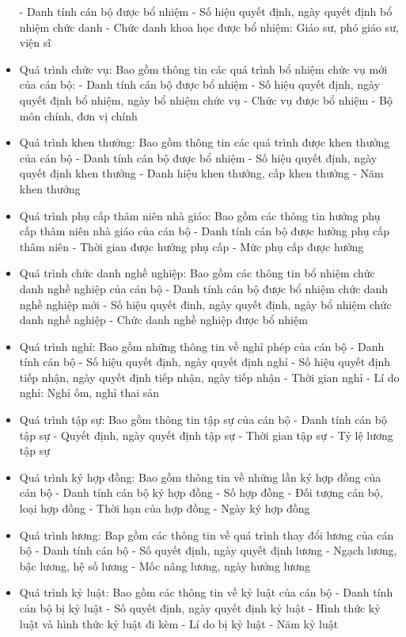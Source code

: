 \begin{itemize}
        \subitem - Danh tính cán bộ được bổ nhiệm
        \subitem - Số hiệu quyết định, ngày quyết định bổ nhiệm chức danh
        \subitem - Chức danh khoa học được bổ nhiệm: Giáo sư, phó giáo sư, viện sĩ
    \item Quá trình chức vụ: Bao gồm thông tin các quá trình bổ nhiệm chức vụ mới của cán bộ:
        \subitem - Danh tính cán bộ được bổ nhiệm
        \subitem - Số hiệu quyết định, ngày quyết định bổ nhiệm, ngày bổ nhiệm chức vụ
        \subitem - Chức vụ được bổ nhiệm
        \subitem - Bộ môn chính, đơn vị chính
    \item Quá trình khen thưởng: Bao gồm thông tin các quá trình được khen thưởng của cán bộ
        \subitem - Danh tính cán bộ được bổ nhiệm
        \subitem - Số hiệu quyết định, ngày quyết định khen thưởng
        \subitem - Danh hiệu khen thưởng, cấp khen thưởng
        \subitem - Năm khen thưởng
    \item Quá trình phụ cấp thâm niên nhà giáo: Bao gồm các thông tin hưởng phụ cấp thâm niên nhà giáo của cán bộ
        \subitem - Danh tính cán bộ được hưởng phụ cấp thâm niên
        \subitem - Thời gian được hưởng phụ cấp
        \subitem - Mức phụ cấp được hưởng
    \item Quá trình chức danh nghề nghiệp: Bao gồm các thông tin bổ nhiệm chức danh nghề nghiệp của cán bộ
        \subitem - Danh tính cán bộ được bổ nhiệm chức danh nghề nghiệp mới
        \subitem - Số hiệu quyết đinh, ngày quyết định, ngày bổ nhiệm chức danh nghề nghiệp
        \subitem - Chức danh nghề nghiệp được bổ nhiệm
    \item Quá trình nghỉ: Bao gồm những thông tin về nghỉ phép của cán bộ
        \subitem - Danh tính cán bộ
        \subitem - Số hiệu quyết định, ngày quyết định nghỉ
        \subitem - Số hiệu quyết định tiếp nhận, ngày quyết định tiếp nhận, ngày tiếp nhận
        \subitem - Thời gian nghỉ
        \subitem - Lí do nghỉ: Nghỉ ốm, nghỉ thai sản
    \item Quá trình tập sự: Bao gồm thông tin tập sự của cán bộ
        \subitem - Danh tính cán bộ tập sự
        \subitem - Quyết định, ngày quyết định tập sự
        \subitem - Thời gian tập sự
        \subitem - Tỷ lệ lương tập sự
    \item Quá trình ký hợp đồng: Bao gồm thông tin về những lần ký hợp đồng của cán bộ
        \subitem - Danh tính cán bộ ký hợp đồng
        \subitem - Số hợp đồng
        \subitem - Đối tượng cán bộ, loại hợp đồng
        \subitem - Thời hạn của hợp đồng
        \subitem - Ngày ký hợp đồng
    \item Quá trình lương: Bap gồm các thông tin về quá trình thay đổi lương của cán bộ
        \subitem - Danh tính cán bộ
        \subitem - Số quyết định, ngày quyết định lương
        \subitem - Ngạch lương, bậc lương, hệ số lương
        \subitem - Mốc nâng lương, ngày hưởng lương
    \item Quá trình kỷ luật: Bao gồm các thông tin về kỷ luật của cán bộ
        \subitem - Danh tính cán bộ bị kỷ luật
        \subitem - Số quyết định, ngày quyết định kỷ luật
        \subitem - Hình thức kỷ luật và hình thức kỷ luật đi kèm
        \subitem - Lí do bị kỷ luật
        \subitem - Năm kỷ luật
\end{itemize}

